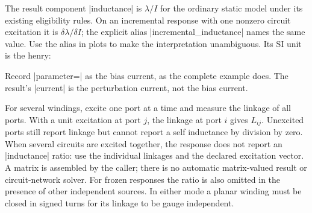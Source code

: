 
\begin{codeexample}[width=0pt]
\end{codeexample}


The result component |inductance| is $\lambda/I$ for the ordinary static
model under its existing eligibility rules. On an incremental response with
one nonzero circuit excitation it is $\delta\lambda/\delta I$; the explicit
alias |incremental_inductance| names the same value. Use the alias in
plots to make the interpretation unambiguous. Its SI unit is the henry:
\begin{codeexample}
\femmresultplot[results={small-a,small-b,small-c},
  component=incremental_inductance,abscissa=parameter,
  plot options={orange!75!black,thick,mark=square*}]
\end{codeexample}
Record |parameter=| as the bias current, as the complete example does.
The result's |current| is the perturbation current, not the bias current.

For several windings, excite one port at a time and measure the linkage of
all ports. With a unit excitation at port $j$, the linkage at port $i$ gives
$L_{ij}$. Unexcited ports still report linkage but cannot report a self
inductance by division by zero. When several circuits are excited together,
the response does not report an |inductance| ratio: use the individual
linkages and the declared excitation vector. A matrix is assembled by the
caller; there is no automatic matrix-valued result or circuit-network solver.
For frozen responses the ratio is also omitted in the presence of other
independent sources. In either mode a planar winding must be closed in signed
turns for its linkage to be gauge independent.

